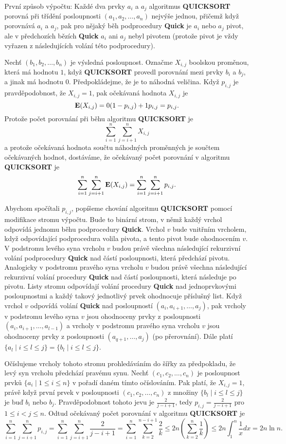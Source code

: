 \documentclass[a4paper,12pt]{article}
\begin{document}
První způsob výpočtu:\newline 
Každé dva prvky $a_i$ a $a_j$ algoritmus {\bf QUICKSORT} porovná 
při třídění posloupnosti $(a_1,a_2,\dots,a_n)$ nejvýše jednou, 
přičemž když porovnává $a_i$ a $a_j$, 
pak pro nějaký běh podprocedury {\bf Quick} je $a_i$ nebo $
a_j$ 
pivot, ale v předchozích bězích {\bf Quick} $a_i$ ani $
a_j$ 
nebyl pivotem (protože pivot je vždy vyřazen z následujících 
volání této podprocedury).

Nechť $(b_1,b_2,\dots,b_n)$ je výsledná posloupnost.  
Označme $X_{i,j}$ boolskou proměnou, která má hodnotu $
1$, 
když {\bf QUICKSORT} provedl porovnání mezi prvky $b_i$ a $
b_j$, a 
jinak má hodnotu $0$.  Předpokládejme, že je to náhodná 
veličina. Když $p_{i,j}$ je prav\-dě\-podobnost, že $
X_{i,j}=1$, 
pak očekávaná hodnota $X_{i,j}$ je 
$$\bold E(X_{i,j})=0(1-p_{i,j})+1p_{i,j}=p_{i,j}.$$
Protože počet porovnání  při běhu algoritmu {\bf QUICKSORT} je
$$\sum_{i=1}^n\sum_{j=i+1}^nX_{i,j}$$
a protože očekávaná hodnota součtu náhodných 
proměnných je součtem očekávaných hodnot, dostáváme, že 
očekávaný počet porovnání v algoritmu {\bf QUICKSORT} je
$$\sum_{i=1}^n\sum_{j=i+1}^n\bold E(X_{i,j})=\sum_{i=1}^n\sum_{j=
i+1}^np_{i,j}.$$

Abychom spočítali $p_{i,j}$, popíšeme chování algoritmu 
{\bf QUICKSORT} pomocí modifikace stromu výpočtu. Bude to binární 
strom, v němž každý vrchol odpovídá jednomu 
běhu podprocedury {\bf Quick}. Vrchol $v$ bude vnitřním 
vrcholem, 
když odpovída\-jí\-cí podprocedura volila pivota, a tento 
pivot bude ohodnocením $v$. V podstromu levého syna vrcholu $
v$
budou právě všechna následující rekurzivní volání podprocedury 
{\bf Quick} nad částí posloupnosti, která předchází pivotu. 
Analogicky v podstromu 
pravého syna vrcholu $v$ budou právě všechna následující 
rekurzivní volání procedury {\bf Quick} nad částí 
posloupnosti, která následuje po pivotu. 
Listy stromu odpovídají volání procedury {\bf Quick} nad 
jednoprvkovými posloupnost\-mi a každý takový jednotlivý 
prvek ohodnocuje příslušný  
list. Když vrchol $v$ odpovídá volání {\bf Quick} nad posloupností 
$(a_i,a_{i+1},\dots,a_j)$, pak vrcholy v podstromu levého syna $
v$ jsou 
ohodnoceny prvky z posloupnosti $(a_i,a_{i+1},\dots,a_{l-1})$ a vrcholy v 
podstromu pravého syna vrcholu $v$ jsou ohodnoceny prvky z posloupnosti 
$(a_{q+1},\dots,a_j)$ (po přerovnání).
Dále platí $\{a_l\mid i\le l\le j\}=\{b_l\mid i\le l\le j\}$.

Očíslujeme vrcholy tohoto stromu prohledáváním do 
šířky za předpokladu, že levý syn vrcholu předchází 
pravému synu. Nechť $(c_1,c_2,\dots,c_n)$ je posloupnost 
prvků $\{a_i\mid 1\le i\le n\}$ v pořadí daném tímto 
očíslováním. Pak platí, že $X_{i,j}=1$, právě když první 
prvek v posloupnosti $(c_1,c_2,\dots,c_n)$ z množi\-ny 
$\{b_l\mid i\le l\le j\}$ je bu\v d $b_i$ nebo $b_j$. Pravděpodobnost tohoto 
jevu je $\frac 2{j-i+1}$, tedy $p_{i,j}=\frac 2{j-i+1}$ pro $1\le 
i<j\le n$. Odtud 
očekávaný počet porovnání v algoritmu {\bf QUICKSORT} je
$$\sum_{i=1}^n\sum_{j=i+1}^np_{i,j}=\sum_{i=1}^n\sum_{j=i+1}^n\frac 
2{j-i+1}=\sum_{i=1}^n\sum_{k=2}^{n-i+1}\frac 2k\le 2n(\sum_{k=2}^
n\frac 1k)\le 2n\int_1^n\frac 1xdx=2n\ln n.$$
\end{document}
